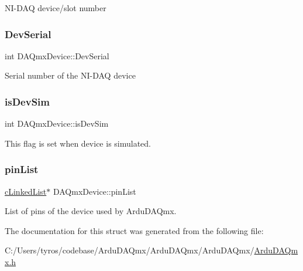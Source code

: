 N\+I-\/\+D\+AQ device/slot number \mbox{\label{struct_d_a_qmx_device_af76a0d98a8b47eda2aba51fba33da147}} 
\subsubsection{\texorpdfstring{Dev\+Serial}{DevSerial}}
{\footnotesize\ttfamily int D\+A\+Qmx\+Device\+::\+Dev\+Serial}

Serial number of the N\+I-\/\+D\+AQ device \mbox{\label{struct_d_a_qmx_device_a27c7b25db245ca2d5bf91c28ac37f08c}} 
\subsubsection{\texorpdfstring{is\+Dev\+Sim}{isDevSim}}
{\footnotesize\ttfamily int D\+A\+Qmx\+Device\+::is\+Dev\+Sim}

This flag is set when device is simulated. \mbox{\label{struct_d_a_qmx_device_a23df66a3e413397d12503b0c06eddb21}} 
\subsubsection{\texorpdfstring{pin\+List}{pinList}}
{\footnotesize\ttfamily \mbox{\hyperlink{structc_linked_list_t_a_g}{c\+Linked\+List}}$\ast$ D\+A\+Qmx\+Device\+::pin\+List}

List of pins of the device used by Ardu\+D\+A\+Qmx. 

The documentation for this struct was generated from the following file\+:\begin{DoxyCompactItemize}
\item 
C\+:/\+Users/tyros/codebase/\+Ardu\+D\+A\+Qmx/\+Ardu\+D\+A\+Qmx/\+Ardu\+D\+A\+Qmx/\mbox{\hyperlink{_ardu_d_a_qmx_8h}{Ardu\+D\+A\+Qmx.\+h}}\end{DoxyCompactItemize}
